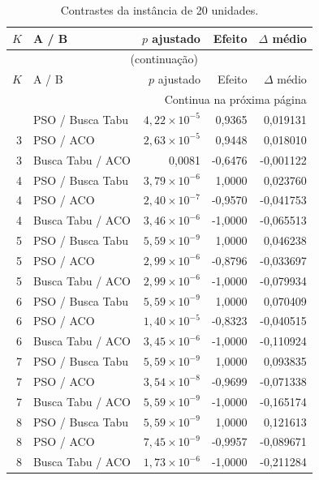 \begingroup\small
\setlength{\tabcolsep}{5pt}
\begin{longtable}{rlrrr}
\caption{Contrastes da instância de 20 unidades.}\label{tab:contrastes-20}\\
\toprule
$K$ & A / B & $p$ ajustado & Efeito & $\Delta$ médio \\
\midrule
\endfirsthead
\multicolumn{5}{c}{\tablename~\thetable{} (continuação)}\\
\toprule
$K$ & A / B & $p$ ajustado & Efeito & $\Delta$ médio \\
\midrule
\endhead
\midrule\multicolumn{5}{r}{Continua na próxima página}\\
\endfoot
\bottomrule
\endlastfoot
3 & PSO / Busca Tabu & $4{,}22\times10^{-5}$ & 0,9365 & 0,019131 \\
3 & PSO / ACO & $2{,}63\times10^{-5}$ & 0,9448 & 0,018010 \\
3 & Busca Tabu / ACO & 0,0081 & -0,6476 & -0,001122 \\
4 & PSO / Busca Tabu & $3{,}79\times10^{-6}$ & 1,0000 & 0,023760 \\
4 & PSO / ACO & $2{,}40\times10^{-7}$ & -0,9570 & -0,041753 \\
4 & Busca Tabu / ACO & $3{,}46\times10^{-6}$ & -1,0000 & -0,065513 \\
5 & PSO / Busca Tabu & $5{,}59\times10^{-9}$ & 1,0000 & 0,046238 \\
5 & PSO / ACO & $2{,}99\times10^{-6}$ & -0,8796 & -0,033697 \\
5 & Busca Tabu / ACO & $2{,}99\times10^{-6}$ & -1,0000 & -0,079934 \\
6 & PSO / Busca Tabu & $5{,}59\times10^{-9}$ & 1,0000 & 0,070409 \\
6 & PSO / ACO & $1{,}40\times10^{-5}$ & -0,8323 & -0,040515 \\
6 & Busca Tabu / ACO & $3{,}45\times10^{-6}$ & -1,0000 & -0,110924 \\
7 & PSO / Busca Tabu & $5{,}59\times10^{-9}$ & 1,0000 & 0,093835 \\
7 & PSO / ACO & $3{,}54\times10^{-8}$ & -0,9699 & -0,071338 \\
7 & Busca Tabu / ACO & $5{,}59\times10^{-9}$ & -1,0000 & -0,165174 \\
8 & PSO / Busca Tabu & $5{,}59\times10^{-9}$ & 1,0000 & 0,121613 \\
8 & PSO / ACO & $7{,}45\times10^{-9}$ & -0,9957 & -0,089671 \\
8 & Busca Tabu / ACO & $1{,}73\times10^{-6}$ & -1,0000 & -0,211284 \\
\end{longtable}
\endgroup

